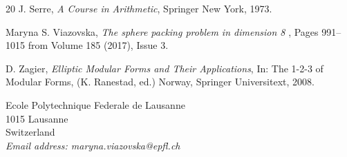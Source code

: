 \begin{thebibliography}{20}
 {\sc J. Serre}, {\em A Course in Arithmetic}, Springer New York, 1973.




 {\sc Maryna S. Viazovska}, {\em The sphere packing problem in dimension 8	},
Pages 991--1015 from Volume 185 (2017), Issue 3.

 {\sc D. Zagier}, {\em Elliptic Modular Forms and Their Applications}, In:  The 1-2-3 of Modular Forms, (K. Ranestad, ed.) Norway, Springer Universitext, 2008.

\end{thebibliography}

\newpage

{\footnotesize
\noindent
Ecole Polytechnique Federale de Lausanne\\
1015 Lausanne\\
Switzerland\\
{\it Email address: maryna.viazovska@epfl.ch}}



\newtheorem{theorem}{Theorem}
\newtheorem*{theorem*}{Theorem}
\newtheorem{corollary}[theorem]{Corollary}
\newtheorem{hypothesis}[theorem]{Hypothesis}
\newtheorem{proposition}[theorem]{Proposition}
\newtheorem{lemma}[theorem]{Lemma}
\newtheorem{definition}[theorem]{Definition}
\newtheorem{conjecture}[theorem]{Conjecture}
\newtheorem{example}[theorem]{Example}
\newtheorem{question}[theorem]{Question}
\newtheorem{remark}[theorem]{Remark}

\newcommand{\R}{\mathbb{R}}
\newcommand{\Z}{\mathbb{Z}}
\newcommand{\C}{\mathbb{C}}
\newcommand{\N}{\mathbb{N}}
\newcommand{\h}{\mathfrak{H}}


\usepackage{geometry}

